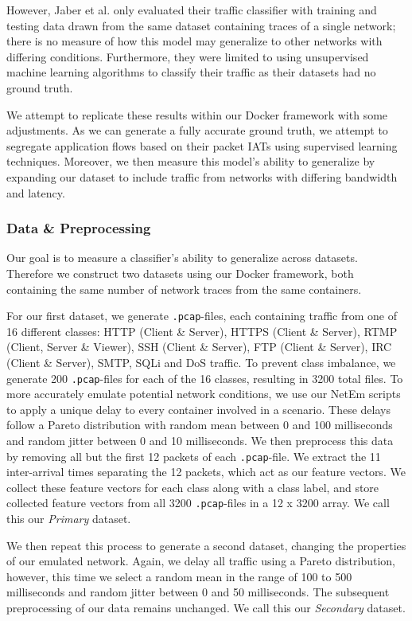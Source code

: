 \documentclass[sigconf]{acmart}
\begin{document}
 However, Jaber et al. \cite{jaber2011can} only evaluated their traffic classifier with training and testing data drawn from the same dataset containing traces of a single network; there is no measure of how this model may generalize to other networks with differing conditions. Furthermore, they were limited to using unsupervised machine learning algorithms to classify their traffic as their datasets had no ground truth. 

We attempt to replicate these results within our Docker framework with some adjustments. As we can generate a fully accurate ground truth, we attempt to segregate application flows based on their packet IATs using supervised learning techniques. Moreover, we then measure this model's ability to generalize by expanding our dataset to include traffic from networks with differing bandwidth and latency.

\subsubsection*{Data \& Preprocessing}

Our goal is to measure a classifier's ability to generalize across datasets. Therefore we construct two datasets using our Docker framework, both containing the same number of network traces from the same containers. 

For our first dataset, we generate \texttt{.pcap}-files, each containing traffic from one of 16 different classes: HTTP (Client \& Server), HTTPS (Client \& Server), RTMP (Client, Server \& Viewer), SSH (Client \& Server), FTP (Client \& Server), IRC (Client \& Server), SMTP, SQLi and DoS traffic. To prevent class imbalance, we generate 200 \texttt{.pcap}-files for each of the 16 classes, resulting in 3200 total files. To more accurately emulate potential network conditions, we use our NetEm scripts to apply a unique delay to every container involved in a scenario. These delays follow a Pareto distribution with random mean between 0 and 100 milliseconds and random jitter between 0 and 10 milliseconds. We then preprocess this data by removing all but the first 12 packets of each \texttt{.pcap}-file. We extract the 11 inter-arrival times separating the 12 packets, which act as our feature vectors. We collect these feature vectors for each class along with a class label, and store collected feature vectors from all 3200 \texttt{.pcap}-files in a 12 x 3200 array. We call this our \textit{Primary} dataset.

We then repeat this process to generate a second dataset, changing the properties of our emulated network. Again, we delay all traffic using a Pareto distribution, however, this time we select a random mean in the range of 100 to 500 milliseconds and random jitter between 0 and 50 milliseconds. The subsequent preprocessing of our data remains unchanged. We call this our \textit{Secondary} dataset.
\end{document}
